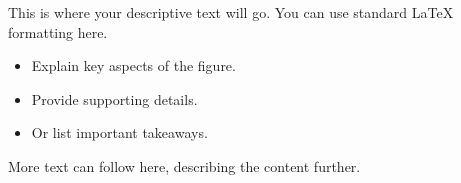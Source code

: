 \documentclass[12pt]{beamer} %
\begin{document}
\begin{frame}
\begin{columns}[T]
			\begin{column}{0.50\textwidth} %
				This is where your descriptive text will go.
				You can use standard LaTeX formatting here.
				\begin{itemize}
					\item Explain key aspects of the figure.
					\item Provide supporting details.
					\item Or list important takeaways.
				\end{itemize}
				More text can follow here, describing the content further.
			\end{column}
			
		\end{columns}
	\end{frame}
	
\end{document}
